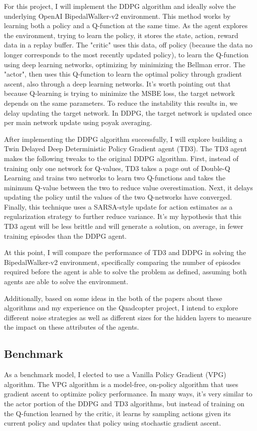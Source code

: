 \documentclass{article}
\begin{document}
For this project, I will implement the DDPG algorithm and ideally solve the underlying OpenAI BipedalWalker-v2 environment. This method works by learning both a policy and a Q-function at the same time. As the agent explores the environment, trying to learn the policy, it stores the state, action, reward data in a replay buffer. The "critic" uses this data, off policy (because the data no longer corresponds to the most recently updated policy), to learn the Q-function using deep learning networks, optimizing by minimizing the Bellman error. The "actor", then uses this Q-function to learn the optimal policy through gradient ascent, also through a deep learning networks. It's worth pointing out that because Q-learning is trying to minimize the MSBE loss, the target network depends on the same parameters. To reduce the instability this results in, we delay updating the target network. In DDPG, the target network is updated once per main network update using poyak averaging.

After implementing the DDPG algorithm successfully, I will explore building a Twin Delayed Deep Deterministic Policy Gradient agent (TD3). The TD3 agent makes the following tweaks to the original DDPG algorithm. First, instead of training only one network for Q-values, TD3 takes a page out of Double-Q Learning and trains two networks to learn two Q-functions and takes the minimum Q-value between the two to reduce value overestimation. Next, it delays updating the policy until the values of the two Q-networks have converged. Finally, this technique uses a SARSA-style update for action estimates as a regularization strategy to further reduce variance. It's my hypothesis that this TD3 agent will be less brittle and will generate a solution, on average, in fewer training episodes than the DDPG agent.

At this point, I will compare the performance of TD3 and DDPG in solving the BipedalWalker-v2 environment, specifically comparing the number of episodes required before the agent is able to solve the problem as defined, assuming both agents are able to solve the environment.

Additionally, based on some ideas in the both of the papers about these algorithms and my experience on the Quadcopter project, I intend to explore different noise strategies as well as different sizes for the hidden layers to measure the impact on these attributes of the agents.


\subsection{Benchmark}
As a benchmark model, I elected to use a Vanilla Policy Gradient (VPG) algorithm. The VPG algorithm is a model-free, on-policy algorithm that uses gradient ascent to optimize policy performance. In many ways, it's very similar to the actor portion of the DDPG and TD3 algorithms, but instead of training on the Q-function learned by the critic, it learns by sampling actions given its current policy and updates that policy using stochastic gradient ascent.
\end{document}
